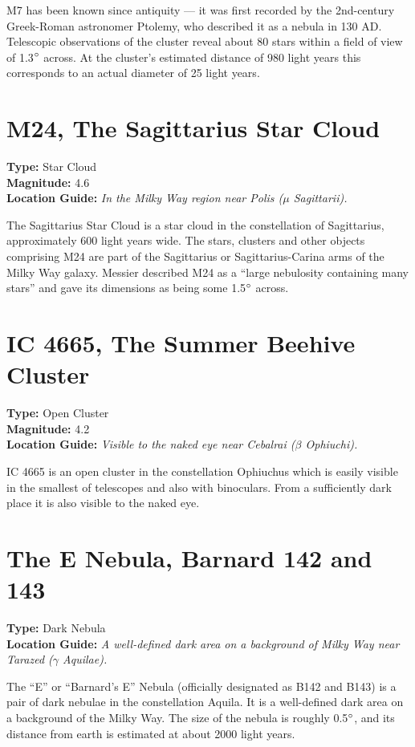 M7 has been known since antiquity --- it was first recorded by the
2nd-century Greek-Roman astronomer Ptolemy, who described it as a
nebula in 130 AD. Telescopic observations of the cluster reveal about
80 stars within a field of view of 1.3$\degree$ across. At the
cluster's estimated distance of 980 light years this corresponds to an
actual diameter of 25 light years.

\section{M24, The Sagittarius Star Cloud}
\textbf{Type:} Star Cloud \\
\textbf{Magnitude:} 4.6 \\ 
\textbf{Location Guide:} \textit{In the Milky Way region near Polis ($\mu$ Sagittarii).}

The Sagittarius Star Cloud is a star cloud in the constellation of
Sagittarius, approximately 600 light years wide. The stars, clusters
and other objects comprising M24 are part of the Sagittarius or
Sagittarius-Carina arms of the Milky Way galaxy. Messier described M24
as a ``large nebulosity containing many stars'' and gave its
dimensions as being some 1.5$\degree$ across.

\section{IC 4665, The Summer Beehive Cluster}
\textbf{Type:} Open Cluster \\
\textbf{Magnitude:} 4.2 \\ 
\textbf{Location Guide:} \textit{Visible to the naked eye near Cebalrai ($\beta$ Ophiuchi).}

IC 4665 is an open cluster in the constellation Ophiuchus which is
easily visible in the smallest of telescopes and also with
binoculars. From a sufficiently dark place it is also visible to the
naked eye.

\section{The E Nebula, Barnard 142 and 143}
\textbf{Type:} Dark Nebula \\
\textbf{Location Guide:} \textit{A well-defined dark area on a background of Milky Way near Tarazed ($\gamma$ Aquilae).}

The ``E'' or ``Barnard's E'' Nebula (officially designated as B142 and
B143) is a pair of dark nebulae in the constellation Aquila. It is a
well-defined dark area on a background of the Milky Way. The size of the
nebula is roughly 0.5$\degree$, and its distance from earth is
estimated at about 2000 light years.

